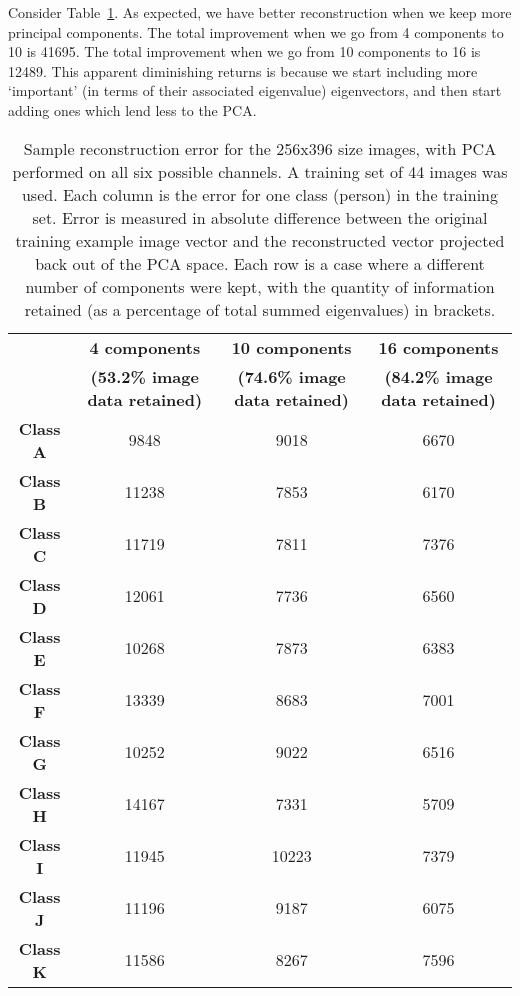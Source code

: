 Consider Table~\ref{tbl:face-rec-2}. As expected, we have better reconstruction when we keep more principal components. The total improvement when we go from 4 components to 10 is 41695. The total improvement when we go from 10 components to 16 is 12489. This apparent diminishing returns is because we start including more `important' (in terms of their associated eigenvalue) eigenvectors, and then start adding ones which lend less to the PCA.

\begin{table}[h!]
  \centering
  \begin{tabular}{c c c c}
    \toprule
    \textbf{ } & \textbf{4 components} & \textbf{10 components} & \textbf{16 components} \\
    \textbf{ } & \textbf{(53.2\% image data retained)} & \textbf{(74.6\% image data retained)} & \textbf{(84.2\% image data retained)} \\
    \midrule
    \textbf{Class A} & 9848 & 9018 & 6670\\
    \textbf{Class B} & 11238 & 7853 & 6170\\ 
    \textbf{Class C} & 11719 & 7811 & 7376\\ 
    \textbf{Class D} & 12061 & 7736 & 6560\\
    \textbf{Class E} & 10268 & 7873 & 6383\\
    \textbf{Class F} & 13339 & 8683 & 7001\\ 
    \textbf{Class G} & 10252 & 9022 & 6516\\ 
    \textbf{Class H} & 14167 & 7331 & 5709\\
    \textbf{Class I} & 11945 & 10223 & 7379\\
    \textbf{Class J} & 11196 & 9187 & 6075\\ 
    \textbf{Class K} & 11586 & 8267 & 7596\\
    \bottomrule
  \end{tabular}
  \caption[Sample reconstruction error for the 256x396 size images]{Sample reconstruction error for the 256x396 size images, with PCA performed on all six possible channels. A training set of 44 images was used. Each column is the error for one class (person) in the training set. Error is measured in absolute difference between the original training example image vector and the reconstructed vector projected back out of the PCA space. Each row is a case where a different number of components were kept, with the quantity of information retained (as a percentage of total summed eigenvalues) in brackets.}
  \label{tbl:face-rec-2}
\end{table}

